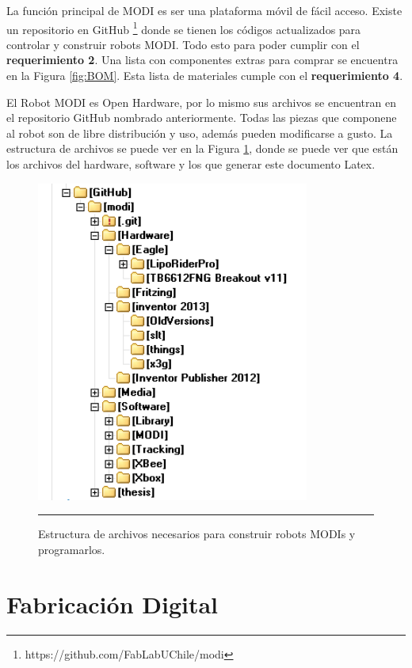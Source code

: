 La función principal de MODI es ser una plataforma móvil de fácil acceso. Existe un repositorio en GitHub  \footnote{https://github.com/FabLabUChile/modi} donde se tienen los códigos actualizados para controlar y construir robots MODI. Todo esto para poder cumplir con el \textbf{requerimiento 2}. Una lista con componentes extras para comprar se encuentra en la Figura \ref{fig:BOM}. Esta lista de materiales cumple con el \textbf{requerimiento 4}. 

El Robot MODI es Open Hardware, por lo mismo sus archivos se encuentran en el repositorio GitHub nombrado anteriormente. Todas las piezas que componene al robot son de libre distribución y uso, además pueden modificarse a gusto. La estructura de archivos se puede ver en la Figura \ref{fig:tree}, donde se puede ver que están los archivos del hardware, software y los que generar este documento Latex.
\begin{figure}[htbp]
	\centering
		\includegraphics[width=0.8\textwidth]{./Figures/MODI/tree.png}
		\rule{35em}{0.5pt}
	\caption[Estructura de archivos]{Estructura de archivos necesarios para construir robots MODIs y programarlos.}
	\label{fig:tree}
\end{figure}




\section{Fabricación Digital}

